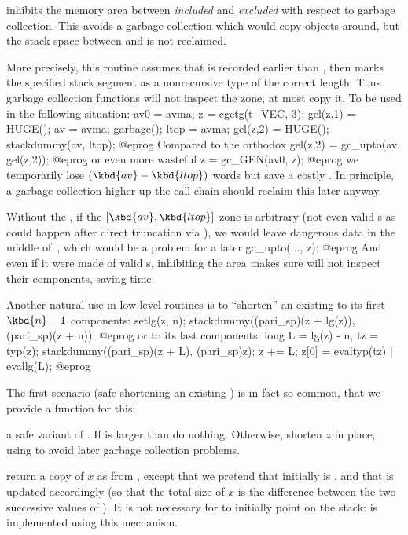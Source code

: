 
 inhibits the memory area
between  \emph{included} and  \emph{excluded} with respect to
garbage collection. This avoids a garbage collection which would copy objects
around, but the stack space between  and  is not reclaimed.

More precisely, this routine assumes that  is recorded earlier
than , then marks the specified stack segment as a
nonrecursive type of the correct length. Thus garbage collection functions
will not inspect the zone, at most copy it. To be used in the following
situation:
\bprog
  av0 = avma; z = cgetg(t_VEC, 3);
  gel(z,1) = HUGE(); av = avma; garbage(); ltop = avma;
  gel(z,2) = HUGE(); stackdummy(av, ltop);
@eprog\noindent
Compared to the orthodox
\bprog
  gel(z,2) = gc_upto(av, gel(z,2));
@eprog\noindent
or even more wasteful
\bprog
  z = gc_GEN(av0, z);
@eprog\noindent
we temporarily lose $(\kbd{av} - \kbd{ltop})$ words but save a costly
. In principle, a garbage collection higher up the call
chain should reclaim this later anyway.

Without the , if the $[\kbd{av}, \kbd{ltop}]$ zone is
arbitrary (not even valid s as could happen after direct
truncation via ), we would leave dangerous data in the middle
of~, which would be a problem for a later
\bprog
  gc_upto(..., z);
@eprog\noindent
And even if it were made of valid s, inhibiting the area makes sure
 will not inspect their components, saving time.

Another natural use in low-level routines is to ``shorten'' an existing
  to its first $\kbd{n}-1$ components:
\bprog
  setlg(z, n);
  stackdummy((pari_sp)(z + lg(z)), (pari_sp)(z + n));
@eprog\noindent
or to its last  components:
\bprog
  long L = lg(z) - n, tz = typ(z);
  stackdummy((pari_sp)(z + L), (pari_sp)z);
  z += L; z[0] = evaltyp(tz) | evallg(L);
@eprog

The first scenario (safe shortening an existing ) is in fact so
common, that we provide a function for this:

 a safe variant of . If
 is larger than  do nothing. Otherwise, shorten $z$ in
place, using  to avoid later garbage collection problems.

 return a copy of $x$ as from
, except that we pretend that initially  is ,
and that  is updated accordingly (so that the total size of $x$ is
the difference between the two successive values of ). It is not
necessary for  to initially point on the stack:  is
implemented using this mechanism.


